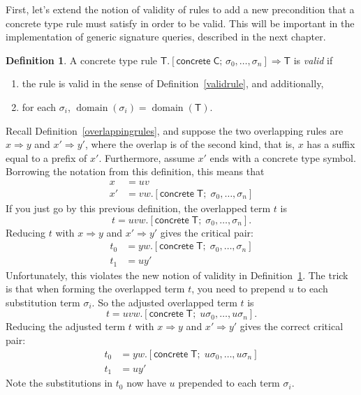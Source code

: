 \documentclass[headsepline,bibliography=totoc]{scrreport}
\newcommand{\namesym}[1]{\mathsf{#1}}
\newcommand{\concretesym}[1]{[\mathsf{concrete}\;#1]}
\DeclareMathOperator{\domain}{domain}
\theoremstyle{definition}
\theoremstyle{definition}
\newtheorem{definition}{Definition}[chapter]
\theoremstyle{definition}
\begin{document}
First, let's extend the notion of validity of rules to add a new precondition that a concrete type rule must satisfy in order to be valid. This will be important in the implementation of generic signature queries, described in the next chapter.
\begin{definition}\label{concretevalid}
A concrete type rule $\namesym{T}.\concretesym{\namesym{C};\,\sigma_0,\ldots,\sigma_n}\Rightarrow\namesym{T}$ is \emph{valid} if
\begin{enumerate}
\item the rule is valid in the sense of Definition~\ref{validrule}, and additionally,
\item for each $\sigma_i$, $\domain(\sigma_i)=\domain(\namesym{T})$.
\end{enumerate}
\end{definition}

Recall Definition~\ref{overlappingrules}, and suppose the two overlapping rules are $x\Rightarrow y$ and $x'\Rightarrow y'$, where the overlap is of the second kind, that is, $x$ has a suffix equal to a prefix of $x'$. Furthermore, assume $x'$ ends with a concrete type symbol. Borrowing the notation from this definition, this means that
\begin{align*}
x&=uv\\
x'&=vw.\concretesym{\namesym{T};\;\sigma_0,\ldots,\sigma_n}
\end{align*}
If you just go by this previous definition, the overlapped term $t$ is
\[t=uvw.\concretesym{\namesym{T};\;\sigma_0,\ldots,\sigma_n}.\]
Reducing $t$ with $x\Rightarrow y$ and $x'\Rightarrow y'$ gives the critical pair:
\begin{align*}
t_0&=yw.\concretesym{\namesym{T};\;\sigma_0,\ldots,\sigma_n}\\
t_1&=uy'
\end{align*}
Unfortunately, this violates the new notion of validity in Definition~\ref{concretevalid}. The trick is that when forming the overlapped term $t$, you need to prepend $u$ to each substitution term $\sigma_i$. So the adjusted overlapped term $t$ is
\[t=uvw.\concretesym{\namesym{T};\;u\sigma_0,\ldots,u\sigma_n}.\]
Reducing the adjusted term $t$ with $x\Rightarrow y$ and $x'\Rightarrow y'$ gives the correct critical pair:
\begin{align*}
t_0&=yw.\concretesym{\namesym{T};\;u\sigma_0,\ldots,u\sigma_n}\\
t_1&=uy'
\end{align*}
Note the substitutions in $t_0$ now have $u$ prepended to each term $\sigma_i$.
\end{document}
